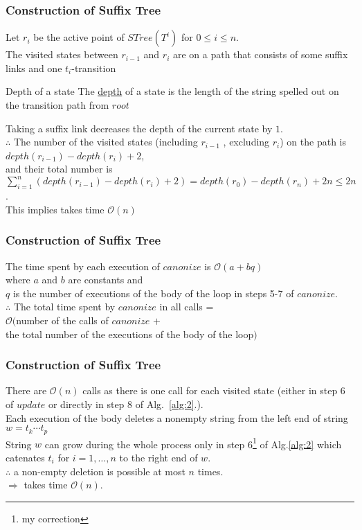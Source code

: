 \documentclass[compress,usenames,dvipsnames]{beamer}
\newcommand*\diamonded[1]{\tikz[baseline=(char.base)]{
\node[shape=diamond,draw,inner sep=2pt] (char) {#1};}}
\newenvironment{definitionblock}[1]{
    \setbeamercolor{block title}{bg=cyan}
    \begin{block}{#1}}{\end{block}
}
\begin{document}
\begin{frame}\frametitle{Construction of Suffix Tree}
    Let $r_i$ be the active point of $STree(T^{i})$ for $0 \leq i \leq n$. \\
    The visited states between $r_{i-1}$ and $r_i$ are on a path that consists of some suffix links and one $t_i$-transition
    \begin{definitionblock}{Depth of a state}
        The \underline{depth} of a state is the length of the string spelled out on the transition path from $root$
    \end{definitionblock}
    Taking a suffix link decreases the depth of the current state by $1$.\\
    $\therefore$ The number of the visited states (including $r_{i-1}$ , excluding $r_i$) on the path is $depth(r_{i-1}) - depth(r_i) + 2$, \\
    \hfill \break
    and their total number is $\sum_{i=1}^{n} (depth(r_{i-1}) - depth(r_i) + 2) = depth(r_0) - depth(r_n) + 2n \leq 2n$. \\
    This implies \diamonded{2} takes time $\mathcal{O}(n)$
\end{frame}

\begin{frame}\frametitle{Construction of Suffix Tree}
    The time spent by each execution of $canonize$ is $\mathcal{O}(a + bq)$ \\
    where $a$ and $b$ are constants and \\
    $q$ is the number of executions of the body of the loop in steps 5-7 of $canonize$. \\
    $\therefore$ The total time spent by $canonize$ in all calls = \\
    $\mathcal{O}($number of the calls of $canonize$ $+$ \\
    the total number of the executions of the body of the loop$)$ \\
\end{frame}

\begin{frame}\frametitle{Construction of Suffix Tree}
    There are $\mathcal{O}(n)$ calls as there is one call for each visited state (either in step 6 of $update$ or directly in step 8 of Alg.~\ref{alg:2}.). \\
    Each execution of the body deletes a nonempty string from the left end of string $w = t_k\cdots t_p$ \\
    String $w$ can grow during the whole process only in step 6\footnote[1]{my correction} of Alg.\ref{alg:2} which catenates $t_i$ for $i = 1,\ldots,n$ to the right end of $w$. \\
    \hfill \break
    $\therefore$ a non-empty deletion is possible at most $n$ times. \\
    $\Rightarrow$ \diamonded{1} takes time $\mathcal{O}(n)$.

\end{frame}
\end{document}
